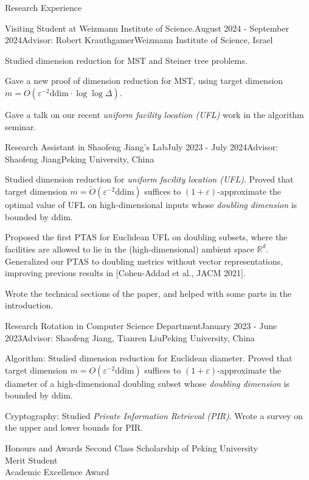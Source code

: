 \documentclass{resume} %
\begin{document}
\begin{rSection}{Research Experience}{}
    \begin{rSubsection}{Visiting Student at Weizmann Institute of Science.}{August 2024 - September 2024}{Advisor: Robert Krauthgamer}{Weizmann Institute of Science, Israel}
        \item Studied dimension reduction for MST and Steiner tree problems.
        \item Gave a new proof of dimension reduction for MST, using target dimension $m = O(\varepsilon^{-2} \mathrm{ddim} \cdot \log\log \Delta)$.
        \item Gave a talk on our recent \emph{uniform facility location (UFL)} work in the algorithm seminar.
    \end{rSubsection}

    \begin{rSubsection}{Research Assistant in Shaofeng Jiang's Lab}{July 2023 - July 2024}{Advisor: Shaofeng Jiang}{Peking University, China}
       \item Studied dimension reduction for \emph{uniform facility location (UFL)}. 
       Proved that target dimension $m = \tilde{O}(\varepsilon^{-2} \mathrm{ddim})$ suffices to $(1+\varepsilon)$-approximate the optimal value of UFL on high-dimensional inputs whose \emph{doubling dimension} is bounded by $\mathrm{ddim}$.
       \item Proposed the first PTAS for Euclidean UFL on doubling subsets, where the facilities are allowed to lie in the (high-dimensional) ambient space $\mathbb{R}^d$. 
       Generalized our PTAS to doubling metrics without vector representations, improving previous results in [Cohen-Addad et al., JACM 2021].
       \item Wrote the technical sections of the paper, and helped with some parts in the introduction.
    \end{rSubsection}

    \begin{rSubsection}{Research Rotation in Computer Science Department}{January 2023 - June 2023}{Advisor: Shaofeng Jiang, Tianren Liu}{Peking University, China}
        \item Algorithm: Studied dimension reduction for Euclidean diameter. 
        Proved that target dimension $m = O(\varepsilon^{-2} \mathrm{ddim})$ suffices to $(1+\varepsilon)$-approximate the diameter of a high-dimensional doubling subset whose \emph{doubling dimension} is bounded by $\mathrm{ddim}$.
        \item Cryptography: Studied \emph{Private Information Retrieval (PIR)}.
        Wrote a survey on the upper and lower bounds for PIR.
    \end{rSubsection}
\end{rSection}

\begin{rSection}{Honours and Awards}{}
    Second Class Scholarship of Peking University 
    \\ Merit Student 
    \\ Academic Excellence Award 
\end{rSection}
\end{document}
